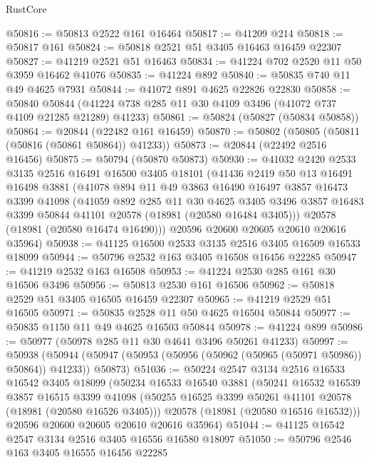 \begin{lexlean}{RustCore}
\begin{coremodule}
@50816 := @50813 @2522 @161 @16464
@50817 := @41209 @214
@50818 := @50817 @161
@50824 := @50818 @2521 @51 @3405 @16463 @16459 @22307
@50827 := @41219 @2521 @51 @16463
@50834 := @41224 @702 @2520 @11 @50 @3959 @16462 @41076
@50835 := @41224 @892
@50840 := @50835 @740 @11 @49 @4625 @7931
@50844 := @41072 @891 @4625 @22826 @22830
@50858 := @50840
    @50844
    (@41224 @738 @285 @11 @30 @4109 @3496 (@41072 @737 @4109 @21285 @21289) @41233)
@50861 := @50824 (@50827 (@50834 @50858))
@50864 := @20844 (@22482 @161 @16459)
@50870 := @50802 (@50805 (@50811 (@50816 (@50861 @50864)) @41233))
@50873 := @20844 (@22492 @2516 @16456)
@50875 := @50794 (@50870 @50873)
@50930 := @41032
    @2420
    @2533
    @3135
    @2516
    @16491
    @16500
    @3405
    @18101
    (@41436
      @2419
      @50
      @13
      @16491
      @16498
      @3881
      (@41078
        @894
        @11
        @49
        @3863
        @16490
        @16497
        @3857
        @16473
        @3399
        @41098
        (@41059
          @892
          @285
          @11
          @30
          @4625
          @3405
          @3496
          @3857
          @16483
          @3399
          @50844
          @41101
          @20578
          (@18981 (@20580 @16484 @3405)))
        @20578
        (@18981 (@20580 @16474 @16490)))
      @20596
      @20600
      @20605
      @20610
      @20616
      @35964)
@50938 := @41125 @16500 @2533 @3135 @2516 @3405 @16509 @16533 @18099
@50944 := @50796 @2532 @163 @3405 @16508 @16456 @22285
@50947 := @41219 @2532 @163 @16508
@50953 := @41224 @2530 @285 @161 @30 @16506 @3496
@50956 := @50813 @2530 @161 @16506
@50962 := @50818 @2529 @51 @3405 @16505 @16459 @22307
@50965 := @41219 @2529 @51 @16505
@50971 := @50835 @2528 @11 @50 @4625 @16504 @50844
@50977 := @50835 @1150 @11 @49 @4625 @16503 @50844
@50978 := @41224 @899
@50986 := @50977 (@50978 @285 @11 @30 @4641 @3496 @50261 @41233)
@50997 := @50938
    (@50944 (@50947 (@50953 (@50956 (@50962 (@50965 (@50971 @50986)) @50864)) @41233)) @50873)
@51036 := @50224
    @2547
    @3134
    @2516
    @16533
    @16542
    @3405
    @18099
    (@50234
      @16533
      @16540
      @3881
      (@50241
        @16532
        @16539
        @3857
        @16515
        @3399
        @41098
        (@50255 @16525 @3399 @50261 @41101 @20578 (@18981 (@20580 @16526 @3405)))
        @20578
        (@18981 (@20580 @16516 @16532)))
      @20596
      @20600
      @20605
      @20610
      @20616
      @35964)
@51044 := @41125 @16542 @2547 @3134 @2516 @3405 @16556 @16580 @18097
@51050 := @50796 @2546 @163 @3405 @16555 @16456 @22285

\end{coremodule}
\end{lexlean}
